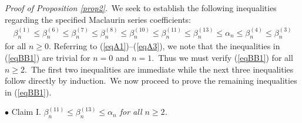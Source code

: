 \documentclass[final,oneeqnum]{siamltex}
\begin{document}
{\it Proof of Proposition {\rm\ref{prop2}}}.\ We seek to establish
the following inequalities  regarding the specified Maclaurin
series coefficients:
\begin{eqnarray}
 \beta^{(1)}_{n}\leq \beta^{(6)}_{n}\leq \beta^{(7)}_{n}\leq
\beta^{(8)}_{n}\leq
\beta^{(10)}_{n} \leq \beta^{(11)}_{n}\leq \beta^{(13)}_{n}\leq
\alpha_{n}\leq\beta^{(4)}_{n}\leq\beta^{(3)}_{n}
 \label{eqBB1}
\end{eqnarray}
for all $n\geq 0$.
Referring to (\ref{eqA1})--(\ref{eqA3}), we note
that the inequalities in (\ref{eqBB1}) are trivial for $n=0$
and $n=1$.\  Thus   we must verify (\ref{eqBB1})
 for all  $n\geq 2$.\ The first two inequalities are immediate while the
 next three inequalities follow directly by induction.\  We
 now proceed to prove the remaining inequalities in
(\ref{eqBB1}).

\noindent$\bullet$ Claim I. {\em
 $\displaystyle \beta^{(11)}_{n} \leq  \beta^{(13)}_{n}\leq \alpha_{n}$
for all $n\geq 2$.}
\end{document}
